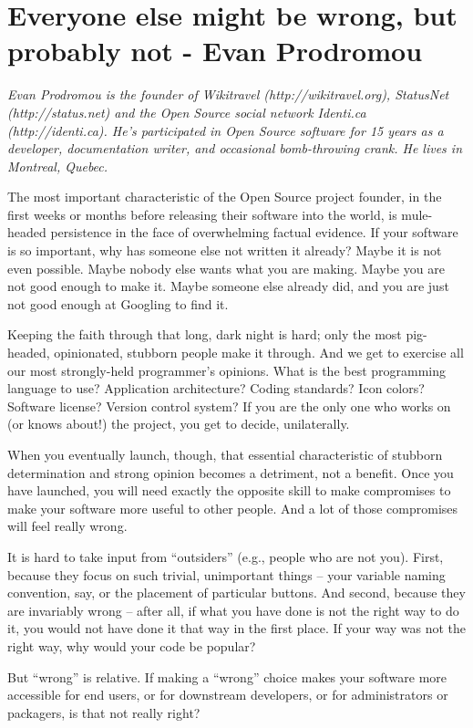 \chapter{Everyone else might be wrong, but probably not - Evan Prodromou}

\textit{Evan Prodromou is the founder of Wikitravel (http://wikitravel.org),
StatusNet (http://status.net) and the Open Source social network Identi.ca
(http://identi.ca). He's participated in Open Source software for 15 years as a
developer, documentation writer, and occasional bomb-throwing crank. He lives in
Montreal, Quebec.}

The most important characteristic of the Open Source project founder, in the
first weeks or months before releasing their software into the world, is
mule-headed persistence in the face of overwhelming factual evidence. If your
software is so important, why has someone else not written it already? Maybe it is
not even possible. Maybe nobody else wants what you are making. Maybe you are not
good enough to make it. Maybe someone else already did, and you are just not good
enough at Googling to find it.

Keeping the faith through that long, dark night is hard; only the most
pig-headed, opinionated, stubborn people make it through. And we get to exercise
all our most strongly-held programmer's opinions. What is the best programming
language to use? Application architecture? Coding standards? Icon colors?
Software license? Version control system? If you are the only one who works on
(or knows about!) the project, you get to decide, unilaterally.

When you eventually launch, though, that essential characteristic of stubborn
determination and strong opinion becomes a detriment, not a benefit. Once you have
launched, you will need exactly the opposite skill to make compromises to make
your software more useful to other people. And a lot of those compromises will
feel really wrong.

It is hard to take input from ``outsiders'' (e.g., people who are not you). First,
because they focus on such trivial, unimportant things -- your variable naming
convention, say, or the placement of particular buttons. And second, because
they are invariably wrong -- after all, if what you have done is not the right way to
do it, you would not have done it that way in the first place. If your way was not
the right way, why would your code be popular?

But ``wrong'' is relative. If making a ``wrong'' choice makes your software more
accessible for end users, or for downstream developers, or for administrators or
packagers, is that not really right?

